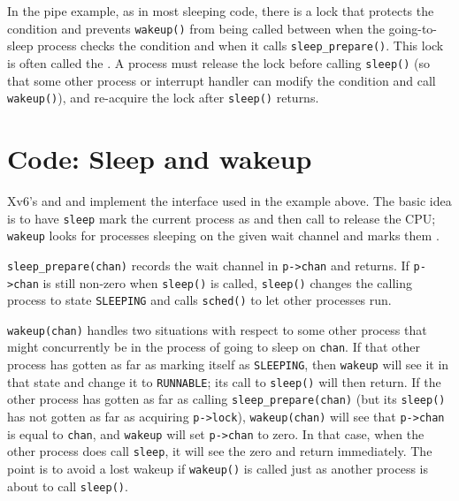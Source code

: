 In the pipe example, as in most sleeping code, there is a lock that
protects the condition and prevents \lstinline{wakeup()} from being
called between when the going-to-sleep process checks the condition
and when it calls \lstinline{sleep_prepare()}. This lock is often
called the . A process must release the lock
before calling \lstinline{sleep()} (so that some other process or
interrupt handler can modify the condition and call
\lstinline{wakeup()}), and re-acquire the lock after
\lstinline{sleep()} returns.

\section{Code: Sleep and wakeup}

Xv6's 
 and 
 and 
 implement the interface used in the
example above. The basic idea is to have \lstinline{sleep} mark the
current process as  and then call
 to release the CPU; \lstinline{wakeup} looks for
processes sleeping on the given wait channel and marks them
.

\lstinline{sleep_prepare(chan)} records the wait channel in
\lstinline{p->chan} and returns. If \lstinline{p->chan} is still
non-zero when \lstinline{sleep()} is called, \lstinline{sleep()}
changes the calling process to state \lstinline{SLEEPING} and calls
\lstinline{sched()} to let other processes run.

\lstinline{wakeup(chan)} handles two situations with respect to some
other process that might concurrently be in the process of going to
sleep on \lstinline{chan}. If that other process has gotten as far as
marking itself as \lstinline{SLEEPING}, then \lstinline{wakeup} will
see it in that state and change it to \lstinline{RUNNABLE}; its call
to \lstinline{sleep()} will then return. If the other process has
gotten as far as calling \lstinline{sleep_prepare(chan)} (but its
\lstinline{sleep()} has not gotten as far as acquiring
\lstinline{p->lock}), \lstinline{wakeup(chan)} will see that
\lstinline{p->chan} is equal to \lstinline{chan}, and
\lstinline{wakeup} will set \lstinline{p->chan} to zero. In that case,
when the other process does call \lstinline{sleep}, it will see the
zero and return immediately. The point is to avoid a lost wakeup if
\lstinline{wakeup()} is called just as another process is about to
call \lstinline{sleep()}.

